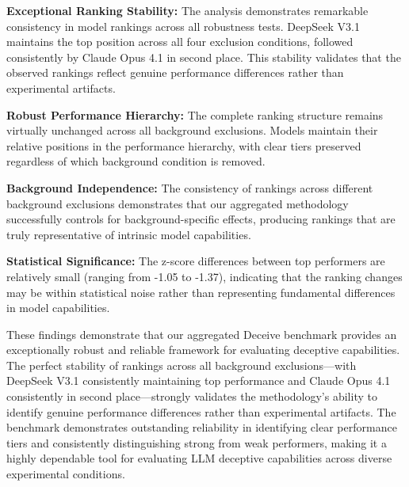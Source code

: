 \documentclass{article}
\begin{document}
\textbf{Exceptional Ranking Stability:} The analysis demonstrates remarkable consistency in model rankings across all robustness tests. DeepSeek V3.1 maintains the top position across all four exclusion conditions, followed consistently by Claude Opus 4.1 in second place. This stability validates that the observed rankings reflect genuine performance differences rather than experimental artifacts.

\textbf{Robust Performance Hierarchy:} The complete ranking structure remains virtually unchanged across all background exclusions. Models maintain their relative positions in the performance hierarchy, with clear tiers preserved regardless of which background condition is removed.

\textbf{Background Independence:} The consistency of rankings across different background exclusions demonstrates that our aggregated methodology successfully controls for background-specific effects, producing rankings that are truly representative of intrinsic model capabilities.

\textbf{Statistical Significance:} The z-score differences between top performers are relatively small (ranging from -1.05 to -1.37), indicating that the ranking changes may be within statistical noise rather than representing fundamental differences in model capabilities.

These findings demonstrate that our aggregated Deceive benchmark provides an exceptionally robust and reliable framework for evaluating deceptive capabilities. The perfect stability of rankings across all background exclusions—with DeepSeek V3.1 consistently maintaining top performance and Claude Opus 4.1 consistently in second place—strongly validates the methodology's ability to identify genuine performance differences rather than experimental artifacts. The benchmark demonstrates outstanding reliability in identifying clear performance tiers and consistently distinguishing strong from weak performers, making it a highly dependable tool for evaluating LLM deceptive capabilities across diverse experimental conditions.
\end{document}
